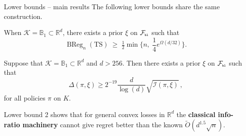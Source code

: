 \documentclass{beamer}
\newcommand{\ball}{\mathbb{B}}
\newcommand{\BReg}{\operatorname{BReg}}
\newcommand{\R}{\mathbb{R}}
\newcommand{\cK}{\mathcal{K}}
\newcommand{\cF}{\mathcal{F}}
\newcommand{\cI}{\mathcal{I}}
\newcommand{\pb}{\text{\tiny\texttt{b}}}
\newcommand{\pl}{\text{\tiny\texttt{l}}}
\begin{document}
\begin{frame}{Lower bounds -- main results}
    \small
    The following lower bounds share the same construction.
    \begin{tcolorbox}[title=Lower Bound 4, colback=red!5, colframe=red!60!black]
        When $\cK = \ball_1 \subset \R^d$, there exists a prior $\xi$ on $\cF_{\pb\pl}$ such that
        \[
            \BReg_n(\text{TS}) \;\ge\; \tfrac12\min\!\bigl\{n,\;\frac{1}{4}e^{\Omega(d/32)}\bigr\}.
        \]
    \end{tcolorbox}
    \begin{tcolorbox}[title=Lower Bound 2, colback=red!5, colframe=red!60!black]
        Suppose that $\cK = \ball_1\subset \R^d$ and $d>256$.
        Then there exists a prior $\xi$ on $\cF_{\pb\pl}$ such that
        \[
            \Delta(\pi, \xi) \geq 2^{-19} \frac{d}{\log(d)} \sqrt{\cI(\pi, \xi)}\,,
        \]
        for all policies $\pi$ on $K$.
    \end{tcolorbox}
    \alert{Lower bound 2} shows that for general convex losses in $\R^d$ the \textbf{classical info-ratio machinery} cannot give regret better than the known \(\widetilde{O}(d^{1.5}\sqrt{n})\).
\end{frame}
\end{document}
